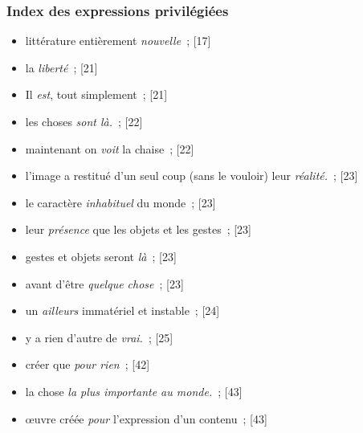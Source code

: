 \documentclass[12pt, a4paper]{article}
\begin{document}
\subsubsection{Index des expressions privilégiées}
    
    
\begin{itemize}

    \item littérature entièrement \textit{nouvelle}{\color{gray}~; [17]}

    \item la \textit{liberté}{\color{gray}~; [21]}

    \item Il \textit{est}, tout simplement{\color{gray}~; [21]}

    \item les choses \textit{sont là.}{\color{gray}~; [22]}

    \item maintenant on \textit{voit} la chaise{\color{gray}~; [22]}

    \item l’image a restitué d’un seul coup (sans le vouloir) leur \textit{réalité.}{\color{gray}~; [23]}

    \item le caractère \textit{inhabituel} du monde{\color{gray}~; [23]}

    \item leur \textit{présence} que les objets et les gestes{\color{gray}~; [23]}

    \item gestes et objets seront \textit{là}{\color{gray}~; [23]}

    \item avant d’être \textit{quelque chose}{\color{gray}~; [23]}

    \item un \textit{ailleurs} immatériel et instable{\color{gray}~; [24]}

    \item y a rien d’autre de \textit{vrai.}{\color{gray}~; [25]}

    \item créer que \textit{pour rien}{\color{gray}~; [42]}

    \item la chose \textit{la plus importante au monde.}{\color{gray}~; [43]}

    \item œuvre créée \textit{pour } l’expression d’un contenu{\color{gray}~; [43]}


\end{itemize}
\end{document}
